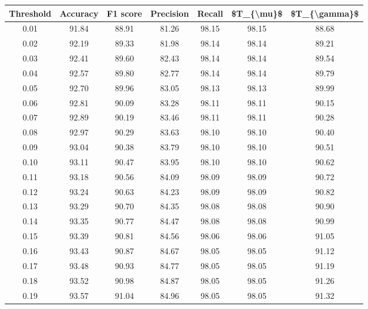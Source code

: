 \begin{tabular}{|c|c|c|c|c|c|c|}
\hline
 Threshold &  Accuracy &  F1 score &  Precision &  Recall &  \$T\_\{\textbackslash mu\}\$ &  \$T\_\{\textbackslash gamma\}\$ \\
\hline
      0.01 &     91.84 &     88.91 &      81.26 &   98.15 &      98.15 &         88.68 \\
      0.02 &     92.19 &     89.33 &      81.98 &   98.14 &      98.14 &         89.21 \\
      0.03 &     92.41 &     89.60 &      82.43 &   98.14 &      98.14 &         89.54 \\
      0.04 &     92.57 &     89.80 &      82.77 &   98.14 &      98.14 &         89.79 \\
      0.05 &     92.70 &     89.96 &      83.05 &   98.13 &      98.13 &         89.99 \\
      0.06 &     92.81 &     90.09 &      83.28 &   98.11 &      98.11 &         90.15 \\
      0.07 &     92.89 &     90.19 &      83.46 &   98.11 &      98.11 &         90.28 \\
      0.08 &     92.97 &     90.29 &      83.63 &   98.10 &      98.10 &         90.40 \\
      0.09 &     93.04 &     90.38 &      83.79 &   98.10 &      98.10 &         90.51 \\
      0.10 &     93.11 &     90.47 &      83.95 &   98.10 &      98.10 &         90.62 \\
      0.11 &     93.18 &     90.56 &      84.09 &   98.09 &      98.09 &         90.72 \\
      0.12 &     93.24 &     90.63 &      84.23 &   98.09 &      98.09 &         90.82 \\
      0.13 &     93.29 &     90.70 &      84.35 &   98.08 &      98.08 &         90.90 \\
      0.14 &     93.35 &     90.77 &      84.47 &   98.08 &      98.08 &         90.99 \\
      0.15 &     93.39 &     90.81 &      84.56 &   98.06 &      98.06 &         91.05 \\
      0.16 &     93.43 &     90.87 &      84.67 &   98.05 &      98.05 &         91.12 \\
      0.17 &     93.48 &     90.93 &      84.77 &   98.05 &      98.05 &         91.19 \\
      0.18 &     93.52 &     90.98 &      84.87 &   98.05 &      98.05 &         91.26 \\
      0.19 &     93.57 &     91.04 &      84.96 &   98.05 &      98.05 &         91.32 \\

\end{tabular}
